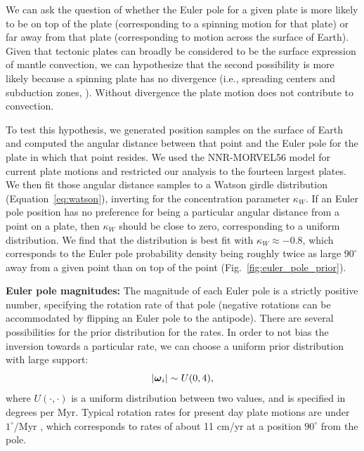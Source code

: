 \documentclass[11pt,letterpaper]{article}
\newcommand{\mitbf}[1]{\hbox{\mathversion{bold}$#1$}}
\begin{document}
We can ask the question of whether the Euler pole for a given plate is more likely to be on top of the plate (corresponding to a spinning motion for that plate) or far away from that plate (corresponding to motion across the surface of Earth).
Given that tectonic plates can broadly be considered to be the surface expression of mantle convection, we can hypothesize that the second possibility is more likely because a spinning plate has no divergence 
(i.e., spreading centers and subduction zones, \citep{Forte1987a, Gable1991a}).  Without divergence the plate motion does not contribute to convection.

To test this hypothesis, we generated position samples on the surface of Earth and computed the angular distance between that point and the Euler pole for the plate in which that point resides. We used the NNR-MORVEL56 model for current plate motions \cite{Argus2011a} and restricted our analysis to the fourteen largest plates. We then fit those angular distance samples to a Watson girdle distribution (Equation~\eqref{eq:watson}),  inverting for the concentration parameter $\kappa_W$. If an Euler pole position has no preference for being a particular angular distance from a point on a plate, then $\kappa_W$ should be close to zero, corresponding to a uniform distribution. We find that the distribution is best fit with $\kappa_W \approx -0.8$, which corresponds to the Euler pole probability density being roughly twice as large $90^\circ$ away from a given point than on top of the point (Fig.~\ref{fig:euler_pole_prior}).

\textbf{Euler pole magnitudes:} 
The magnitude of each Euler pole is a strictly positive number, specifying the rotation rate of that pole (negative rotations can be accommodated by flipping an Euler
pole to the antipode). There are several possibilities for the prior distribution for the rates. In order to not bias the inversion towards a particular rate, we can choose a uniform prior distribution with large support:
\begin{equation}
\vert \mitbf{\omega}_i \vert \sim U(0, 4),
\end{equation}
where $U(\cdot, \cdot)$ is a uniform distribution between two values, and is specified  in degrees per Myr. Typical rotation rates for present day plate motions are under $1^\circ$/Myr \citep{Argus2011a}, which corresponds to rates of about 11 cm/yr at a position $90^\circ$ from the pole.
\end{document}

